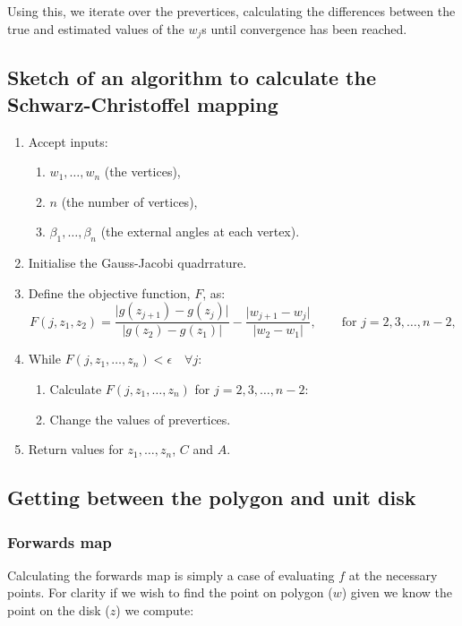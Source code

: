 \documentclass[a4paper,10pt]{amsart}
\newcommand{\sch}{Schwarz-Christoffel }
\begin{document}
Using this, we iterate over the prevertices, calculating the differences between the true and estimated values of the $w_j$s until convergence has been reached.


\subsection{Sketch of an algorithm to calculate the \sch mapping}

\begin{enumerate}
\item Accept inputs:
   \begin{enumerate} 
      \item $w_1,\dots,w_n$ (the vertices),
      \item $n$ (the number of vertices),
      \item $\beta_1,\dots,\beta_n$ (the external angles at each vertex).
   \end{enumerate}
\item Initialise the Gauss-Jacobi quadrrature.
\item Define the objective function, $F$, as:
 \begin{equation*}
 F(j,z_1,z_2) = \frac{\vert g(z_{j+1}) -  g(z_j) \vert}{\vert g(z_2)-g(z_1)\vert} - \frac{\vert w_{j+1} - w_j\vert}{\vert w_2 - w_1\vert}, \qquad \text{for } j=2,3,\dots,n-2,
 \end{equation*}
\item While $F(j,z_1,\dots,z_n) < \epsilon \quad \forall j$:
\begin{enumerate}
  \item Calculate $F(j,z_1,\dots,z_n)$ for $j=2,3,\dots,n-2$:
  \item Change the values of prevertices.
\end{enumerate}
\item Return values for $z_1,\dots,z_n$, $C$ and $A$.
\end{enumerate}



\subsection{Getting between the polygon and unit disk}

\subsubsection{Forwards map}

Calculating the forwards map is simply a case of evaluating $f$ at the necessary points. For clarity if we wish to find the point on polygon ($w$) given we know the point on the disk ($z$) we compute:
\end{document}
